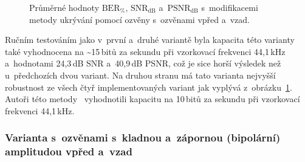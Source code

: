 \begin{figure}[H]
    \table
    \centering
    \caption{Průměrné hodnoty $\mathrm{BER}_{\%}$, $\mathrm{SNR}_\mathrm{dB}$
    a~$\mathrm{PSNR}_\mathrm{dB}$ s~modifikacemi metody ukrývání pomocí
    ozvěny s~ozvěnami vpřed a~vzad.}
    \label{pic:modifications-mean-values-echo-bf}
\end{figure}

Ručním testováním jako v~první a~druhé variantě byla kapacita této varianty
také vyhodnocena na \textasciitilde15\,bitů za sekundu při vzorkovací frekvenci
44,1\,kHz a~hodnotami 24,3\,dB SNR a~40,9\,dB PSNR, což je sice horší výsledek
než u~předchozích dvou variant. Na druhou stranu má tato varianta nejvyšší
robustnost ze všech čtyř implementovaných variant jak vyplývá
z~obrázku~\ref{pic:modifications-mean-values-echo-bf}. Autoři této
metody~\cite{Kim2003} vyhodnotili kapacitu na 10\,bitů za sekundu při
vzorkovací frekvenci 44,1\,kHz.

\subsubsection*{Varianta s~ozvěnami s~kladnou a~zápornou (bipolární) amplitudou
vpřed a~vzad}

